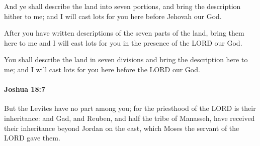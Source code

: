 			\begin{versebox}
					\item[BHS] 
					\item[ASV] And ye shall describe the land into seven portions, and bring the description hither to me; and I will cast lots for you here before Jehovah our God.
					\item[NIV] After you have written descriptions of the seven parts of the land, bring them here to me and I will cast lots for you in the presence of the LORD our God.
					\item[NRSV] You shall describe the land in seven divisions and bring the description here to me; and I will cast lots for you here before the LORD our God.
			\end{versebox}

		\paragraph{Joshua 18:7} %
			\label{JOSHUA-18-7}

			But the Levites have no part among you; for the priesthood of the LORD is their inheritance: and Gad, and Reuben, and half the tribe of Manasseh, have received their inheritance beyond Jordan on the east, which Moses the servant of the LORD gave them.

